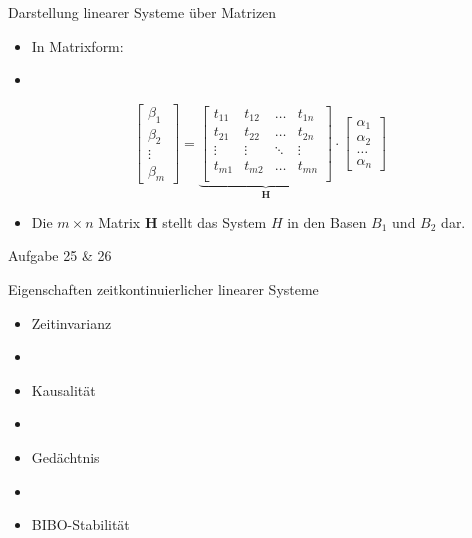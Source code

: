 \documentclass[14pt, aspectratio=169, handout]{beamer}
\begin{document}
\begin{frame}{Darstellung linearer Systeme über Matrizen}
    \begin{itemize}
        \item In Matrixform:
        \item[] 
    \end{itemize}
    $$\begin{bmatrix}
        \beta_1 \\ \beta_2 \\ \vdots \\ \beta_m
    \end{bmatrix} = \underbrace{\begin{bmatrix}
        t_{11} & t_{12} & \dots & t_{1n} \\
        t_{21} & t_{22} & \dots & t_{2n} \\
        \vdots & \vdots & \ddots & \vdots \\
        t_{m1} & t_{m2} & \dots & t_{mn} \\
    \end{bmatrix}}_{\mathbf{H}} \cdot \begin{bmatrix}
        \alpha_1 \\ \alpha_2 \\ \dots \\ \alpha_n
    \end{bmatrix}$$
    \begin{itemize}
        \item Die $m \times n$ Matrix $\mathbf{H}$ stellt das System $H$ in den Basen $B_1$ und $B_2$ dar.
    \end{itemize}
\end{frame}

\begin{frame}{Aufgabe 25 \& 26}
    
\end{frame}

\begin{frame}{Eigenschaften zeitkontinuierlicher linearer Systeme}
    \begin{itemize}
        \item Zeitinvarianz
        \item[] 
        \item Kausalität
        \item[] 
        \item Gedächtnis
        \item[] 
        \item BIBO-Stabilität
    \end{itemize}
\end{frame}
\end{document}

